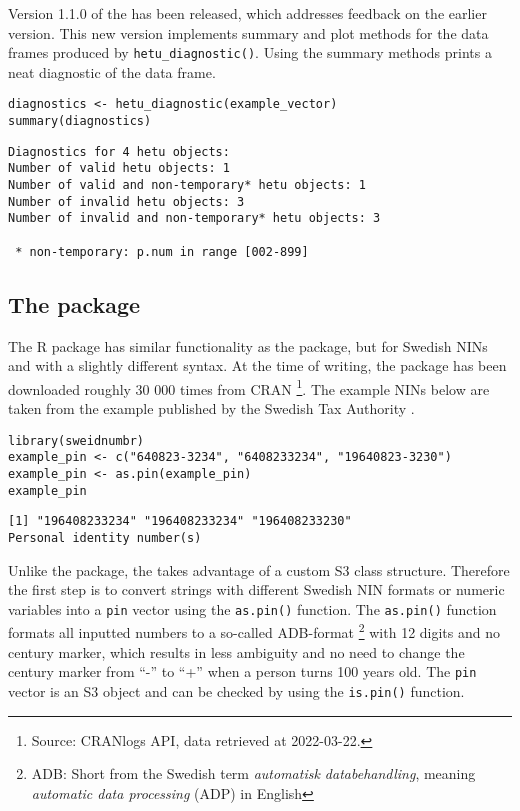 Version 1.1.0 of the  has been released, which addresses feedback on the earlier version. This new version implements summary and plot methods for the data frames produced by \texttt{hetu\_diagnostic()}. Using the summary methods prints a neat diagnostic of the data frame.

\begin{verbatim}
diagnostics <- hetu_diagnostic(example_vector)
summary(diagnostics)
\end{verbatim}

\begin{verbatim}
Diagnostics for 4 hetu objects: 
Number of valid hetu objects: 1 
Number of valid and non-temporary* hetu objects: 1 
Number of invalid hetu objects: 3 
Number of invalid and non-temporary* hetu objects: 3 

 * non-temporary: p.num in range [002-899]
\end{verbatim}

\subsection{The  package}

The  R package has similar functionality as the  package, but for Swedish NINs and with a slightly different syntax. At the time of writing, the package has been downloaded roughly 30 000 times from CRAN \footnote{Source: CRANlogs API, data retrieved at 2022-03-22.}. The example NINs below are taken from the example published by the Swedish Tax Authority \citep{sv2007}.

\begin{verbatim}
library(sweidnumbr)
example_pin <- c("640823-3234", "6408233234", "19640823-3230")
example_pin <- as.pin(example_pin)
example_pin
\end{verbatim}

\begin{verbatim}
[1] "196408233234" "196408233234" "196408233230"
Personal identity number(s)
\end{verbatim}

Unlike the  package, the  takes advantage of a custom S3 class structure. Therefore the first step is to convert strings with different Swedish NIN formats or numeric variables into a \texttt{pin} vector using the \texttt{as.pin()} function. The \texttt{as.pin()} function formats all inputted numbers to a so-called ADB-format \footnote{ADB: Short from the Swedish term \emph{automatisk databehandling}, meaning \emph{automatic data processing} (ADP) in English} with 12 digits and no century marker, which results in less ambiguity and no need to change the century marker from ``-'' to ``+'' when a person turns 100 years old. The \texttt{pin} vector is an S3 object and can be checked by using the \texttt{is.pin()} function.

